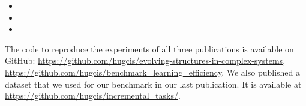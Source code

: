 \begin{itemize}
  \item {}
  \item {}
  \item {}
\end{itemize}

The code to reproduce the experiments of all three publications is available on
GitHub: \url{https://github.com/hugcis/evolving-structures-in-complex-systems},
\url{https://github.com/hugcis/benchmark_learning_efficiency}. We also published a
dataset that we used for our benchmark in our last
publication. It is available at
\url{https://github.com/hugcis/incremental_tasks/}.
